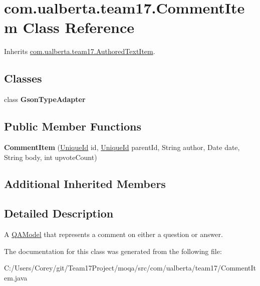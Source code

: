 \hypertarget{classcom_1_1ualberta_1_1team17_1_1_comment_item}{\section{com.\+ualberta.\+team17.\+Comment\+Item Class Reference}
\label{classcom_1_1ualberta_1_1team17_1_1_comment_item}
}


Inherits \hyperlink{classcom_1_1ualberta_1_1team17_1_1_authored_text_item}{com.\+ualberta.\+team17.\+Authored\+Text\+Item}.

\subsection*{Classes}
\begin{DoxyCompactItemize}
\item 
class {\bfseries Gson\+Type\+Adapter}
\end{DoxyCompactItemize}
\subsection*{Public Member Functions}
\begin{DoxyCompactItemize}
\item 
\hypertarget{classcom_1_1ualberta_1_1team17_1_1_comment_item_a3d448f7b70e44c20e9eaa41ee9ca9429}{{\bfseries Comment\+Item} (\hyperlink{classcom_1_1ualberta_1_1team17_1_1_unique_id}{Unique\+Id} id, \hyperlink{classcom_1_1ualberta_1_1team17_1_1_unique_id}{Unique\+Id} parent\+Id, String author, Date date, String body, int upvote\+Count)}\label{classcom_1_1ualberta_1_1team17_1_1_comment_item_a3d448f7b70e44c20e9eaa41ee9ca9429}

\end{DoxyCompactItemize}
\subsection*{Additional Inherited Members}


\subsection{Detailed Description}
A \hyperlink{classcom_1_1ualberta_1_1team17_1_1_q_a_model}{Q\+A\+Model} that represents a comment on either a question or answer. 

The documentation for this class was generated from the following file\+:\begin{DoxyCompactItemize}
\item 
C\+:/\+Users/\+Corey/git/\+Team17\+Project/moqa/src/com/ualberta/team17/Comment\+Item.\+java\end{DoxyCompactItemize}
